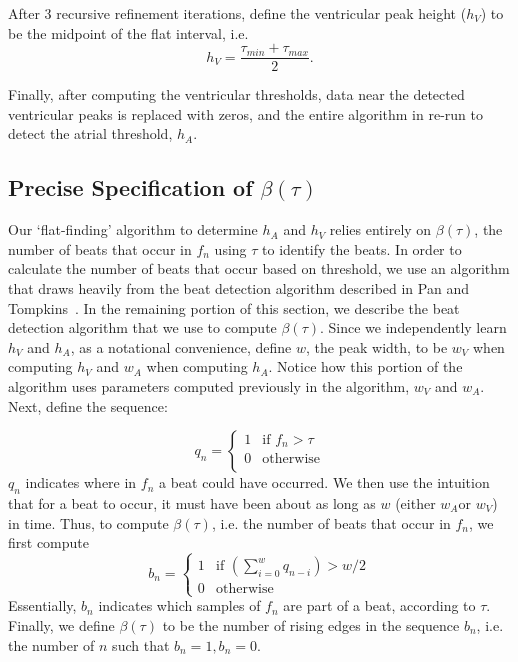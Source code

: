 \documentclass[conference]{IEEEtran}
\newcommand{\APW}{\ensuremath{w_A}}
\newcommand{\VPW}{\ensuremath{w_V}}
\newcommand{\APH}{\ensuremath{h_A}}
\newcommand{\VPH}{\ensuremath{h_V}}
\begin{document}
After 3 recursive refinement iterations, define the ventricular peak height (\VPH{}) to be the midpoint of the flat interval, i.e.
\begin{equation*}
	\VPH{}=\frac{\tau_{min}+\tau_{max}}{2}.
\end{equation*}

Finally, after computing the ventricular thresholds,
data near the detected ventricular peaks is replaced with
zeros, and the entire algorithm in re-run to detect the
atrial threshold, \APH{}.

\subsection{Precise Specification of $\beta(\tau)$}
Our `flat-finding' algorithm to determine \APH{} and
\VPH{} relies entirely on $\beta(\tau)$, 
the number of beats that occur in $f_n$ using
$\tau$ to identify the beats. In order to calculate the
number of beats that occur based on threshold, we use
an algorithm that draws heavily from the beat
detection algorithm described in Pan and Tompkins~\cite{realtime-qrs}.
In the remaining portion of this section, we describe
the beat detection algorithm that we use to compute
$\beta(\tau)$.
Since we independently learn \VPH{} and \APH{}, as a notational convenience, define $w$, the peak width, to be \VPW{} when computing \VPH{} and \APW{} when computing \APH{}.
Notice how this portion of the algorithm uses parameters computed previously in the algorithm, \VPW{} and \APW{}.
Next, define the sequence:

\begin{equation*}
	q_n=\left\{ 
		\begin{array}{lr}
			1 & \text{if } f_n > \tau \\
			0 & \text{otherwise}\\
		\end{array}
		\right.
\end{equation*}
$q_n$ indicates where in $f_n$ a beat could
have occurred. We then use the intuition that for a beat
to occur, it must have been about as long as $w$ (either \APW or \VPW) in time.
Thus, to compute $\beta(\tau)$, i.e. the number of
beats that occur in $f_n$, we first compute
\begin{equation*}
	b_n=\left\{ 
		\begin{array}{lc}
			1 & \text{if } \left(\sum_{i=0}^{w} q_{n-i} \right) > w/2 \\
			0 & \text{otherwise}
		\end{array}
		\right.
\end{equation*}
Essentially, $b_n$ indicates which samples of $f_n$ are part of a beat, according to $\tau$.
Finally, we define $\beta(\tau)$ to be the number of rising edges in the sequence $b_n$, 
i.e. the number of $n$ such that $b_n = 1, b_n = 0$. %
\end{document}
